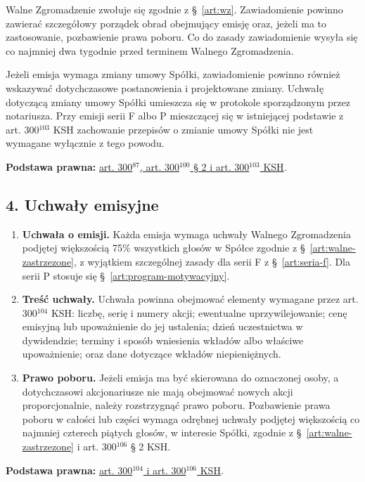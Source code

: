 \documentclass[12pt,a4paper]{report}
\begin{document}
Walne Zgromadzenie zwołuje się zgodnie z §~\ref{art:wz}. Zawiadomienie powinno zawierać szczegółowy porządek obrad obejmujący emisję oraz, jeżeli ma to zastosowanie, pozbawienie prawa poboru. Co do zasady zawiadomienie wysyła się co najmniej dwa tygodnie przed terminem Walnego Zgromadzenia.

Jeżeli emisja wymaga zmiany umowy Spółki, zawiadomienie powinno również wskazywać dotychczasowe postanowienia i projektowane zmiany. Uchwałę dotyczącą zmiany umowy Spółki umieszcza się w protokole sporządzonym przez notariusza. Przy emisji serii F albo P mieszczącej się w istniejącej podstawie z art. 300$^{103}$ KSH zachowanie przepisów o zmianie umowy Spółki nie jest wymagane wyłącznie z tego powodu.

\textbf{Podstawa prawna:} \href{https://eli.gov.pl/api/acts/DU/2024/18/text.html}{art. 300$^{87}$, art. 300$^{100}$ § 2 i art. 300$^{103}$ KSH}.

\subsection*{4. Uchwały emisyjne}

\begin{enumerate}
  \item \textbf{Uchwała o emisji.} Każda emisja wymaga uchwały Walnego Zgromadzenia podjętej większością 75\% wszystkich głosów w Spółce zgodnie z §~\ref{art:walne-zastrzezone}, z wyjątkiem szczególnej zasady dla serii F z §~\ref{art:seria-f}. Dla serii P stosuje się §~\ref{art:program-motywacyjny}.
  \item \textbf{Treść uchwały.} Uchwała powinna obejmować elementy wymagane przez art. 300$^{104}$ KSH: liczbę, serię i numery akcji; ewentualne uprzywilejowanie; cenę emisyjną lub upoważnienie do jej ustalenia; dzień uczestnictwa w dywidendzie; terminy i sposób wniesienia wkładów albo właściwe upoważnienie; oraz dane dotyczące wkładów niepieniężnych.
  \item \textbf{Prawo poboru.} Jeżeli emisja ma być skierowana do oznaczonej osoby, a dotychczasowi akcjonariusze nie mają obejmować nowych akcji proporcjonalnie, należy rozstrzygnąć prawo poboru. Pozbawienie prawa poboru w całości lub części wymaga odrębnej uchwały podjętej większością co najmniej czterech piątych głosów, w interesie Spółki, zgodnie z §~\ref{art:walne-zastrzezone} i art. 300$^{106}$ § 2 KSH.
\end{enumerate}

\textbf{Podstawa prawna:} \href{https://eli.gov.pl/api/acts/DU/2024/18/text.html}{art. 300$^{104}$ i art. 300$^{106}$ KSH}.
\end{document}
